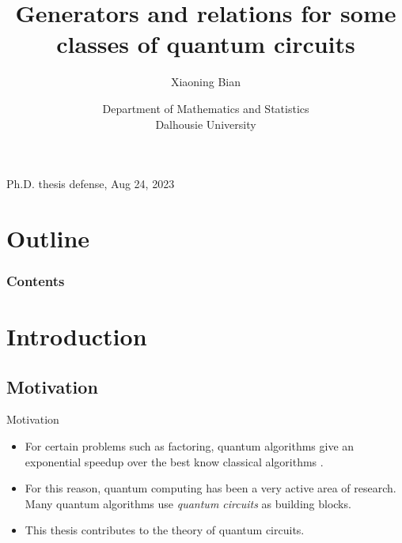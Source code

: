 \documentclass[compress,noamsthm,hyperref={bookmarksopen=true},aspectratio=169]{beamer}
\title{Generators and relations for some classes of quantum circuits}
\author{Xiaoning Bian}
\date{Department of Mathematics and Statistics\\
  Dalhousie University}
\begin{document}
\beamertemplatenavigationsymbolsempty

\begin{frame} %
  \titlepage
  \begin{center}
    Ph.D. thesis defense, Aug 24, 2023
  \end{center}
\end{frame}


\section*{Outline}
\begin{frame}
\frametitle{Contents}
\tableofcontents
\end{frame}

\section{Introduction}
\subsection{Motivation}
\begin{frame}{Motivation}
  \begin{itemize}\setlength\itemsep{1.2em}
  \item For certain problems such as factoring, quantum algorithms
    give an exponential speedup over the best know classical
    algorithms \cite{Shor}.
  \item For this reason, quantum computing has been a very active area
    of research. Many quantum algorithms use \emph{quantum circuits}
    as building blocks.
  \item This thesis contributes to the theory of quantum circuits.
  \end{itemize}
\end{frame}
\end{document}

